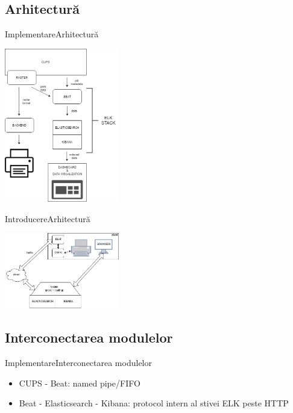 \documentclass{beamer}
\begin{document}
\subsection{Arhitectură}
\begin{frame}{Implementare}{Arhitectură}
	\begin{center}
		\includegraphics[width=50mm]{cups.png}
	\end{center}
\end{frame}
\begin{frame}{Introducere}{Arhitectură}
	\begin{center}
		\includegraphics[width=50mm]{cups-cloud.png}
	\end{center}
\end{frame}
\subsection{Interconectarea modulelor}
\begin{frame}{Implementare}{Interconectarea modulelor}
	\begin{itemize}[<+->]
	\item CUPS - Beat: named pipe/FIFO
	\item Beat - Elasticsearch - Kibana: protocol intern al stivei ELK peste HTTP
	\end{itemize}
\end{frame}


\end{document}
